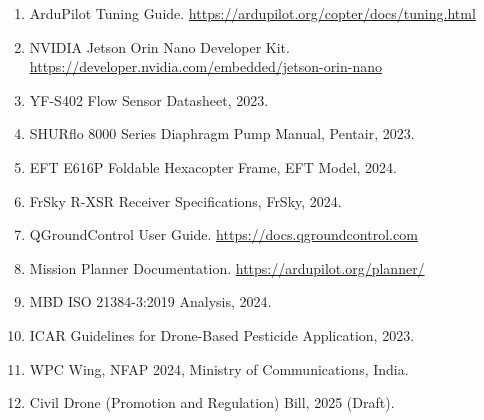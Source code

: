 \documentclass[12pt,a4paper]{article}
\begin{document}
\begin{enumerate}
    \item ArduPilot Tuning Guide. \url{https://ardupilot.org/copter/docs/tuning.html}
    \item NVIDIA Jetson Orin Nano Developer Kit. \url{https://developer.nvidia.com/embedded/jetson-orin-nano}
    \item YF-S402 Flow Sensor Datasheet, 2023.
    \item SHURflo 8000 Series Diaphragm Pump Manual, Pentair, 2023.
    \item EFT E616P Foldable Hexacopter Frame, EFT Model, 2024.
    \item FrSky R-XSR Receiver Specifications, FrSky, 2024.
    \item QGroundControl User Guide. \url{https://docs.qgroundcontrol.com}
    \item Mission Planner Documentation. \url{https://ardupilot.org/planner/}
    \item MBD ISO 21384-3:2019 Analysis, 2024.
    \item ICAR Guidelines for Drone-Based Pesticide Application, 2023.
    \item WPC Wing, NFAP 2024, Ministry of Communications, India.
    \item Civil Drone (Promotion and Regulation) Bill, 2025 (Draft).
\end{enumerate}
\end{document}
